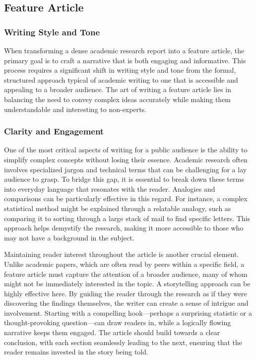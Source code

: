 \documentclass[
]{book}
\begin{document}
\subsection{Feature Article}\label{feature-article}

\subsubsection*{Writing Style and Tone}\label{writing-style-and-tone}

When transforming a dense academic research report into a feature article, the primary goal is to craft a narrative that is both engaging and informative. This process requires a significant shift in writing style and tone from the formal, structured approach typical of academic writing to one that is accessible and appealing to a broader audience. The art of writing a feature article lies in balancing the need to convey complex ideas accurately while making them understandable and interesting to non-experts.

\subsubsection*{Clarity and Engagement}\label{clarity-and-engagement}

One of the most critical aspects of writing for a public audience is the ability to simplify complex concepts without losing their essence. Academic research often involves specialized jargon and technical terms that can be challenging for a lay audience to grasp. To bridge this gap, it is essential to break down these terms into everyday language that resonates with the reader. Analogies and comparisons can be particularly effective in this regard. For instance, a complex statistical method might be explained through a relatable analogy, such as comparing it to sorting through a large stack of mail to find specific letters. This approach helps demystify the research, making it more accessible to those who may not have a background in the subject.

Maintaining reader interest throughout the article is another crucial element. Unlike academic papers, which are often read by peers within a specific field, a feature article must capture the attention of a broader audience, many of whom might not be immediately interested in the topic. A storytelling approach can be highly effective here. By guiding the reader through the research as if they were discovering the findings themselves, the writer can create a sense of intrigue and involvement. Starting with a compelling hook---perhaps a surprising statistic or a thought-provoking question---can draw readers in, while a logically flowing narrative keeps them engaged. The article should build towards a clear conclusion, with each section seamlessly leading to the next, ensuring that the reader remains invested in the story being told.
\end{document}
